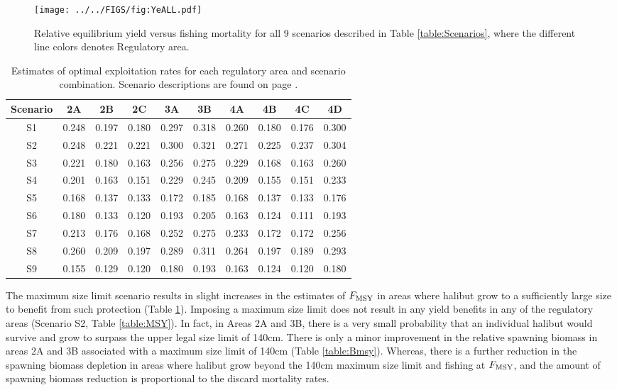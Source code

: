 \begin{figure}[htbp]
	\centering
		\texttt{[image: ../../FIGS/fig:YeALL.pdf]}
	\caption{Relative equilibrium yield versus fishing mortality for all 9 scenarios described in Table \ref{table:Scenarios}, where the different line colors denotes Regulatory area.}
	\label{fig:FIGS_fig:YeALL}
\end{figure}

\begin{table}
	\caption{Estimates of optimal exploitation rates for each regulatory area and scenario combination. Scenario descriptions are found on page \pageref{sub:scenarios}.}
	\label{table:Umsy}
	\begin{center}
		\begin{tabular}{c|ccccccccc}
		\hline
		Scenario & 2A & 2B & 2C & 3A & 3B & 4A & 4B & 4C & 4D\\
		\hline
		S1& 0.248 &0.197 &0.180 &0.297 &0.318 &0.260 &0.180 &0.176 &0.300\\
		S2& 0.248 &0.221 &0.221 &0.300 &0.321 &0.271 &0.225 &0.237 &0.304\\
		S3& 0.221 &0.180 &0.163 &0.256 &0.275 &0.229 &0.168 &0.163 &0.260\\
		S4& 0.201 &0.163 &0.151 &0.229 &0.245 &0.209 &0.155 &0.151 &0.233\\
		S5& 0.168 &0.137 &0.133 &0.172 &0.185 &0.168 &0.137 &0.133 &0.176\\
		S6& 0.180 &0.133 &0.120 &0.193 &0.205 &0.163 &0.124 &0.111 &0.193\\
		S7& 0.213 &0.176 &0.168 &0.252 &0.275 &0.233 &0.172 &0.172 &0.256\\
		S8& 0.260 &0.209 &0.197 &0.289 &0.311 &0.264 &0.197 &0.189 &0.293\\
		S9& 0.155 &0.129 &0.120 &0.180 &0.193 &0.163 &0.124 &0.120 &0.180\\
		\hline
		\end{tabular}
	\end{center}
\end{table}

The maximum size limit scenario results in slight increases in the estimates of $F_{\rm{MSY}}$ in areas where halibut grow to a sufficiently large size to benefit from such protection (Table \ref{table:Umsy}).  Imposing a maximum size limit does not result in any yield benefits in any of the regulatory areas (Scenario S2, Table \ref{table:MSY}).  In fact, in Areas 2A and 3B, there is a very small probability that an individual halibut would survive and grow to surpass the upper legal size limit of 140cm. There is only a minor improvement in the relative spawning biomass in areas 2A and 3B associated with a maximum size limit of 140cm (Table \ref{table:Bmsy}).  Whereas, there is a further reduction in the spawning biomass depletion in areas where halibut grow beyond the 140cm maximum size limit and fishing at $F_{\rm{MSY}}$, and the amount of spawning biomass reduction is proportional to the discard mortality rates.


